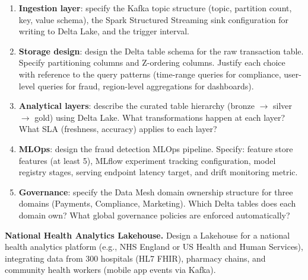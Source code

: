 \begin{enumerate}[label=(\alph*)]
  \item \textbf{Ingestion layer}: specify the Kafka topic structure
        (topic, partition count, key, value schema), the Spark Structured
        Streaming sink configuration for writing to Delta Lake, and the
        trigger interval.
  \item \textbf{Storage design}: design the Delta table schema for the
        raw transaction table. Specify partitioning columns and Z-ordering
        columns. Justify each choice with reference to the query patterns
        (time-range queries for compliance, user-level queries for fraud,
        region-level aggregations for dashboards).
  \item \textbf{Analytical layers}: describe the curated table hierarchy
        (bronze $\to$ silver $\to$ gold) using Delta Lake. What
        transformations happen at each layer? What SLA (freshness,
        accuracy) applies to each layer?
  \item \textbf{MLOps}: design the fraud detection MLOps pipeline.
        Specify: feature store features (at least 5), MLflow experiment
        tracking configuration, model registry stages, serving endpoint
        latency target, and drift monitoring metric.
  \item \textbf{Governance}: specify the Data Mesh domain ownership
        structure for three domains (Payments, Compliance, Marketing).
        Which Delta tables does each domain own? What global governance
        policies are enforced automatically?
\end{enumerate}

\dpr \textbf{National Health Analytics Lakehouse.}
Design a Lakehouse for a national health analytics platform (e.g., NHS
England or US Health and Human Services), integrating data from 300
hospitals (HL7 FHIR), pharmacy chains, and community health workers
(mobile app events via Kafka).

